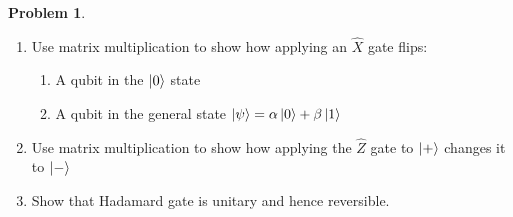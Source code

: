\documentclass[10pt]{article}
\theoremstyle{definition}
\newtheorem{problem}{Problem}
\begin{document}
\begin{problem}~
\begin{enumerate}[label=(\alph*)]
  \item Use matrix multiplication to show how applying an $\hat{X}$ gate flips:
        \begin{enumerate}[label=(\roman*)]
          \item A qubit in the $\ket{0}$ state
          \item A qubit in the general state $\ket{\psi}=\alpha\ket{0}+\beta\ket{1}$
        \end{enumerate}
  \item Use matrix multiplication to show how applying the $\hat{Z}$ gate to $\ket{+}$ changes it to
        $\ket{-}$
  \item Show that Hadamard gate is unitary and hence reversible.
\end{enumerate}
\end{problem}
\end{document}
